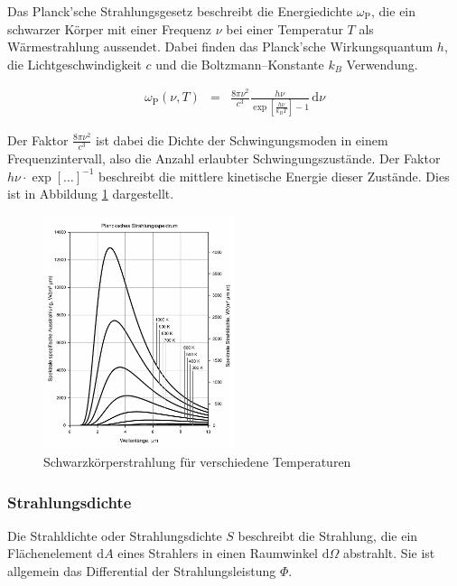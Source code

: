 \documentclass[12pt,a4paper]{scrartcl}
\numberwithin{equation}{section} %
\begin{document}
	Das Planck'sche Strahlungsgesetz beschreibt die Energiedichte $\omega_\mathrm{P}$, die ein schwarzer Körper mit einer Frequenz $\nu$ bei einer Temperatur $T$ als Wärmestrahlung aussendet. Dabei finden das Planck'sche Wirkungsquantum $h$, die Lichtgeschwindigkeit $c$ und die Boltzmann--Konstante $k_B$ Verwendung. \cite{Demtröder Atom}
	
	\begin{eqnarray}
		\omega_\mathrm{P}(\nu,T) &=&
		\frac{8\pi\nu^2}{c^3}
		\frac{h\nu}{\exp\left[\frac{h\nu}{k_BT}\right]-1}
		\,\mathrm d\nu
		\label{eq:PlackStrahlung}
	\end{eqnarray}
	
	\noindent
	Der Faktor $\frac{8\pi\nu^2}{c^3}$ ist dabei die Dichte der Schwingungsmoden in einem Frequenzintervall, also die Anzahl erlaubter Schwingungszustände. Der Faktor $h\nu\cdot\exp[\dots]^{-1}$ beschreibt die mittlere kinetische Energie dieser Zustände. Dies ist in Abbildung \ref{abb:SpektrumSK} dargestellt.
	
	\begin{figure}[h!]
		\centering
		\includegraphics[width=0.5\textwidth]{../media/B1.1/BlackbodySpectrum_lin_150dpi_de.png}
		\caption{Schwarzkörperstrahlung für verschiedene Temperaturen \cite{abb:SpektrumSK}}
		\label{abb:SpektrumSK}
	\end{figure}
	
	\hypertarget{strahlungsdichte}{%
		\subsubsection{Strahlungsdichte}\label{strahlungsdichte}}
	
	Die Strahldichte oder Strahlungsdichte $S$ beschreibt die Strahlung, die ein Flächenelement $\mathrm dA$ eines Strahlers in einen Raumwinkel $\mathrm d\Omega$ abstrahlt. Sie ist allgemein das Differential der Strahlungsleistung $\Phi$. \cite{Demtröder Atom,Strahldichte}
	
\end{document}
